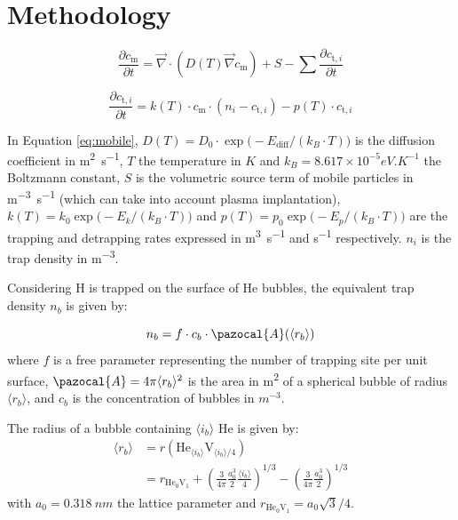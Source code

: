 \newcommand{\Aa}{\mathcal{A}}
\newcommand{\Ab}{\pazocal{A}}

\section{Methodology}

\begin{equation}
    \frac{\partial c_\mathrm{m}}{\partial t}=\vec{\nabla} \cdot\left(D(T) \vec{\nabla}c_\mathrm{m}\right)+S-\sum \frac{\partial c_{\mathrm{t}, i}}{\partial t}
    \label{eq:mobile}
\end{equation}

\begin{equation}
    \frac{\partial c_{\mathrm{t}, i}}{\partial t}=k(T) \cdot c_\mathrm{m} \cdot\left(n_{i}-c_{\mathrm{t}, i}\right)-p(T) \cdot c_{\mathrm{t}, i}
    \label{eq:trapped}
\end{equation}

In Equation \ref{eq:mobile}, ${D(T)=D_0 \cdot \exp\big(-E_\mathrm{diff}/ (k_B \cdot T )\big)}$ is the diffusion coefficient in \si{m^2.s^{-1}}, $T$ the temperature in $\si{K}$ and ${k_B = 8.617 \times 10^{-5} \si{eV.K^{-1}}}$ the Boltzmann constant, $S$ is the volumetric source term of mobile particles in \si{m^{-3}.s^{-1}} (which can take into account plasma implantation), $k(T)=k_0\exp{\big(-E_{k} / (k_B \cdot T ) \big)}$ and $p(T)=p_0\exp{\big(-E_{p}/ (k_B \cdot T )\big)}$ are the trapping and detrapping rates expressed in \si{m^3.s^{-1}} and \si{s^{-1}} respectively.
$n_i$ is the trap density in \si{m^{-3}}.

Considering H is trapped on the surface of He bubbles, the equivalent trap density $n_b$ is given by:

\begin{equation}
    n_b = f \cdot c_b \cdot \Ab(\langle r_b \rangle)
\end{equation}
where $f$ is a free parameter representing the number of trapping site per unit surface, $\Ab = 4\pi \langle r_b \rangle^2$ is the area in \si{m^2} of a spherical bubble of radius $\langle r_b \rangle$, and $c_b$ is the concentration of bubbles in $\si{m^{-3}}$.


The radius of a bubble containing $\langle i_b \rangle$ He is given by:
\begin{equation}
    \begin{split}
        \langle r_b \rangle &= r(\mathrm{He}_{\langle i_b \rangle}\mathrm{V}_{\langle i_b \rangle/4}) \\
        &= r_{\mathrm{He}_0 \mathrm{V}_1} + \left(\frac{3}{4 \pi} \frac{a_0^3}{2} \frac{\langle i_b \rangle}{4} \right)^{1/3} - \left(\frac{3}{4 \pi} \frac{a_0^3}{2} \right)^{1/3}
    \end{split}
    \label{eq: radius average}
\end{equation}
with $a_0 = \SI{0.318}{nm}$ the lattice parameter and $r_{\mathrm{He}_0 \mathrm{V}_1} =  a_0 \sqrt{3}/4$.


